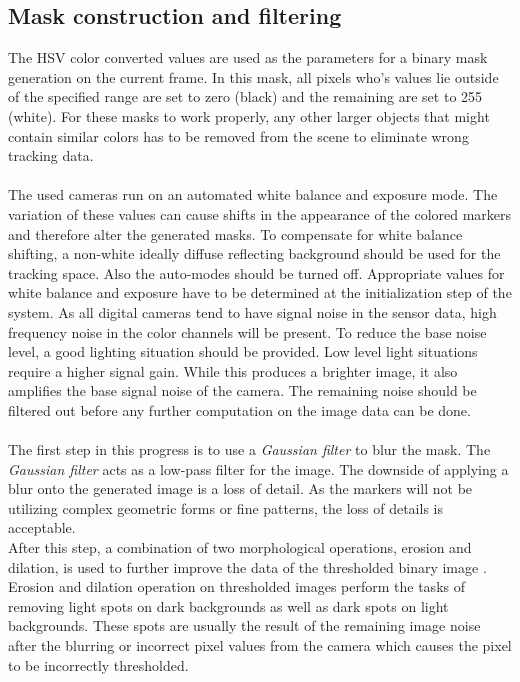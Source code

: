 \subsection{Mask construction and filtering}
The HSV color converted values are used as the parameters for a binary mask generation on the current frame. In this mask, all pixels who's values lie outside of the specified range are set to zero (black) and the remaining are set to 255 (white). For these masks to work properly, any other larger objects that might contain similar colors has to be removed from the scene to eliminate wrong tracking data. 
\\\\The used cameras run on an automated white balance and exposure mode. The variation of these values can cause shifts in the appearance of the colored markers and therefore alter the generated masks. To compensate for white balance shifting, a non-white ideally diffuse reflecting background should be used for the tracking space. Also the auto-modes should be turned off. Appropriate values for white balance and exposure have to be determined at the initialization step of the system. As all digital cameras tend to have signal noise in the sensor data, high frequency noise in the color channels will be present. To reduce the base noise level, a good lighting situation should be provided. Low level light situations require a higher signal gain. While this produces a brighter image, it also amplifies the base signal noise of the camera. The remaining noise should be filtered out before any further computation on the image data can be done.\\\\
The first step in this progress is to use a \textit{Gaussian filter} to blur the mask.
The \textit{Gaussian filter} acts as a low-pass filter for the image. The downside of applying a blur onto the generated image is a loss of detail. As the markers will not be utilizing complex geometric forms or fine patterns, the loss of details is acceptable.\\
After this step, a combination of two morphological operations, erosion and dilation, is used to further improve the data of the thresholded binary image \cite[chapter~3.11-12]{Davies.2017}.
Erosion and dilation operation on thresholded images perform the tasks of removing light spots on dark backgrounds as well as dark spots on light backgrounds. These spots are usually the result of the remaining image noise after the blurring or incorrect pixel values from the camera which causes the pixel to be incorrectly thresholded.\\\\
